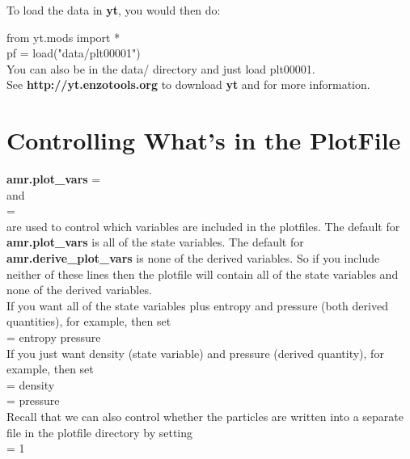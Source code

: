 \noindent To load the data in {\bf yt}, you would then do:

\noindent from yt.mods import * \\
\noindent pf = load("data/plt00001") \\

\noindent You can also be in the data/ directory and just load plt00001. \\

\noindent See {\bf http://yt.enzotools.org} to download {\bf yt} and for more information.

\section{Controlling What's in the PlotFile}

{\bf amr.plot\_vars} = \\

\noindent and  \\

 = \\

\noindent are used to control which variables are included in the plotfiles.  The default for {\bf amr.plot\_vars}
is all of the state variables.  The default for {\bf amr.derive\_plot\_vars} is none of
the derived variables.  So if you include neither of these lines then the plotfile
will contain all of the state variables and none of the derived variables. \\

\noindent If you want all of the state variables plus entropy and pressure (both derived quantities), for example, then set \\

 = entropy pressure \\

\noindent If you just want density (state variable) and pressure (derived quantity), for example, then set \\

 =  density \\

 = pressure \\

Recall that we can also control whether the particles are written into a separate file in the plotfile directory by setting  \\

 = 1

